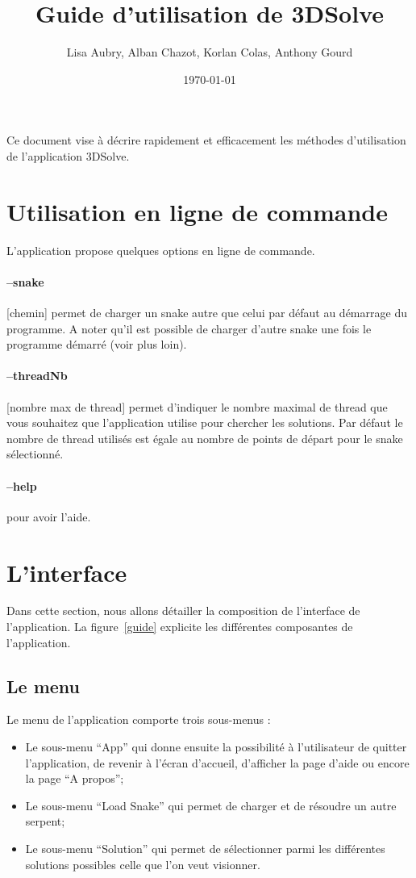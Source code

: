 \documentclass[a4paper,10pt]{article}
\title{Guide d'utilisation de 3DSolve}
\author{Lisa Aubry, Alban Chazot, Korlan Colas, Anthony Gourd}
\date{\today}
\begin{document}
\maketitle

Ce document vise à décrire rapidement et efficacement les méthodes d'utilisation de l'application 3DSolve.

\section{Utilisation en ligne de commande}
L'application propose quelques options en ligne de commande.

\paragraph{--snake} [chemin] permet de charger un snake autre que celui par défaut au démarrage du programme. A noter qu'il est possible de charger d'autre snake une fois le programme démarré (voir plus loin).

\paragraph{--threadNb} [nombre max de thread] permet d'indiquer le nombre maximal de thread que vous souhaitez que l'application utilise pour chercher les solutions. Par défaut le nombre de thread utilisés est égale au nombre de points de départ pour le snake sélectionné.

\paragraph{--help} pour avoir l'aide.

\newpage
\section{L'interface}
Dans cette section, nous allons détailler la composition de l'interface de l'application. La figure~\ref{guide} explicite les différentes composantes de l'application.

\subsection{Le menu}
Le menu de l'application comporte trois sous-menus :
\begin{itemize}
 \item Le sous-menu ``App'' qui donne ensuite la possibilité à l'utilisateur de quitter l'application, de revenir à l'écran d'accueil, d'afficher la page d'aide ou encore la page ``A propos'';
 \item Le sous-menu ``Load Snake'' qui permet de charger et de résoudre un autre serpent;
 \item Le sous-menu ``Solution'' qui permet de sélectionner parmi les différentes solutions possibles celle que l'on veut visionner.
\end{itemize}
\end{document}

